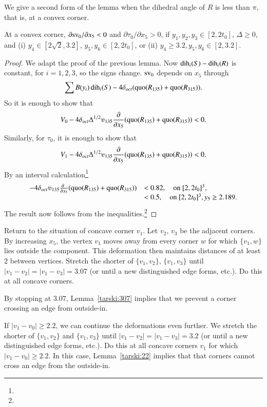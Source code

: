 We give a second form of the lemma when the dihedral angle of $R$ is
less than $\pi$, that is, at a convex corner.


\begin{lemma}
At a convex corner, $\partial {\operatorname{sv}}_0/\partial x_5 <0$ and
    $\partial \tau_0/\partial x_5>0$, if $y_1,y_2,y_3\in[2,2t_0]$,
$\Delta\ge0$, and (i) $y_4\in[2\sqrt{2},3.2]$, $y_5,y_6\in[2,2t_0]$, or
(ii) $y_4\ge 3.2, y_5,y_6\in[2,3.2]$.
\end{lemma}

\begin{proof}
We adapt the proof of the previous lemma.  Now
$\operatorname{dih}_i(S)-\operatorname{dih}_i(R)$ is constant, for $i=1,2,3$, so the signs change.
${\operatorname{sv}}_0$ depends on $x_5$ through
$$\sum B(y_i)\operatorname{dih}_i(S) - 4\delta_{oct} (\operatorname{quo}(R_{135})+\operatorname{quo}(R_{315})).$$
So it is enough to show that
    $$
    V_0 - 4\doct\Delta^{1/2}\ups_{135}\frac{\partial}{\partial x_5}
    (\quo(R_{135})+\quo(R_{315}))<0.
    $$
Similarly, for $\tau_0$, it is enough to show that
    $$
        V_1 - 4\doct\Delta^{1/2}\ups_{135}\frac{\partial}{\partial x_5}
    (\quo(R_{135})+\quo(R_{315}))<0.
    $$
By an interval calculation\footnote{} %
    $$
    \begin{array}{lll}
    -4\doct  \ups_{135}\frac{\partial\phantom{x}}{\partial x_5}
    (\quo(R_{135})+\quo(R_{315}))&< 0.82,\quad\hbox{on } [2,2t_0]^3,\\
                            &<0.5,\quad\hbox{on }[2,2t_0]^3, y_5\ge2.189.
    \end{array}
    $$
The result now follows from
the inequalities.\footnote{} %
\end{proof}

Return to the situation of concave corner $v_1$. Let $v_2$, $v_3$ be the
adjacent corners. By increasing $x_5$, the vertex $v_1$ moves away from
every corner $w$ for which $\{v_1,w\}$ lies outside the component.  This
deformation then maintains distances of at least $2$ between vertices. 
Stretch the shorter of $\{v_1,v_2\}$,
$\{v_1,v_3\}$ until $|v_1-v_2|=|v_1-v_3|=3.07$ (or until a new
distinguished edge forms, etc.).  Do this at all concave corners.

By stopping at $3.07$, Lemma~\ref{tarski:307} implies that we prevent a corner crossing an edge from
outside-in. 

If $|v_1-v_0|\ge2.2$, we can continue the deformations even further. We
stretch the shorter of $\{v_1,v_2\}$ and $\{v_1,v_3\}$ until
$|v_1-v_2|=|v_1-v_3|=3.2$ (or until a new distinguished edge forms,
etc.).  Do this at all concave corners $v_1$ for which $|v_1-v_0|\ge2.2$.  In this case, Lemma~\ref{tarski:22} implies that that corners cannot cross an edge from the outside-in.







